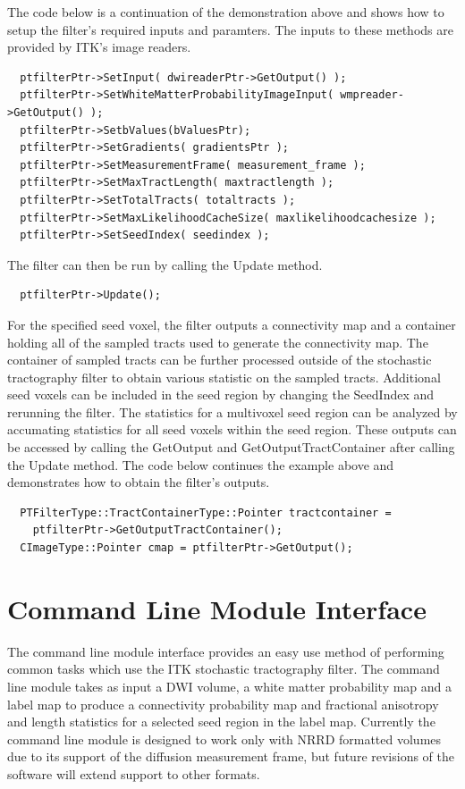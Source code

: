 The code below is a continuation of the demonstration above and shows how to setup the filter's required inputs and paramters.  The inputs to these methods are provided by ITK's image readers.
\begin{verbatim}
  ptfilterPtr->SetInput( dwireaderPtr->GetOutput() );
  ptfilterPtr->SetWhiteMatterProbabilityImageInput( wmpreader->GetOutput() );
  ptfilterPtr->SetbValues(bValuesPtr);
  ptfilterPtr->SetGradients( gradientsPtr );
  ptfilterPtr->SetMeasurementFrame( measurement_frame );
  ptfilterPtr->SetMaxTractLength( maxtractlength );
  ptfilterPtr->SetTotalTracts( totaltracts );
  ptfilterPtr->SetMaxLikelihoodCacheSize( maxlikelihoodcachesize );
  ptfilterPtr->SetSeedIndex( seedindex );
\end{verbatim}

The filter can then be run by calling the Update method.
\begin{verbatim}
  ptfilterPtr->Update();
\end{verbatim}

For the specified seed voxel, the filter outputs a connectivity map and a container holding all of the sampled tracts used to generate the connectivity map.  The container of sampled tracts can be further processed outside of the stochastic tractography filter to obtain various statistic on the sampled tracts.  Additional seed voxels can be included in the seed region by changing the SeedIndex and rerunning the filter.  The statistics for a multivoxel seed region can be analyzed by accumating statistics for all seed voxels within the seed region.  These outputs can be accessed by calling the GetOutput and GetOutputTractContainer after calling the Update method.  The code below continues the example above and demonstrates how to obtain the filter's outputs.
\begin{verbatim}
  PTFilterType::TractContainerType::Pointer tractcontainer = 
    ptfilterPtr->GetOutputTractContainer();
  CImageType::Pointer cmap = ptfilterPtr->GetOutput();
\end{verbatim}

\section{Command Line Module Interface}
The command line module interface provides an easy use method of performing common tasks which use the ITK stochastic tractography filter.  The command line module takes as input a DWI volume, a white matter probability map and a label map to produce a connectivity probability map and fractional anisotropy and length statistics for a selected seed region in the label map.  Currently the command line module is designed to work only with NRRD formatted volumes due to its support of the diffusion measurement frame, but future revisions of the software will extend support to other formats.

